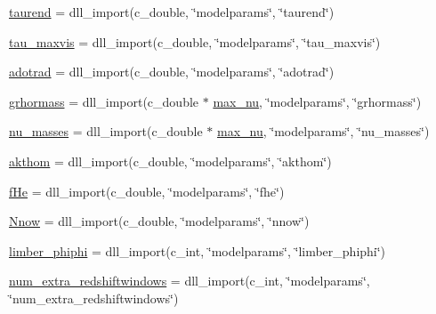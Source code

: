 \begin{DoxyCompactItemize}
\item 
\mbox{\hyperlink{namespacecamb_1_1model_ae2a4e5d8dff7debdb22015f3e0fcf129}{taurend}} = dll\+\_\+import(c\+\_\+double, \char`\"{}modelparams\char`\"{}, \char`\"{}taurend\char`\"{})
\item 
\mbox{\hyperlink{namespacecamb_1_1model_a3a9ced4c13d89e5355fd09949da4f1b7}{tau\+\_\+maxvis}} = dll\+\_\+import(c\+\_\+double, \char`\"{}modelparams\char`\"{}, \char`\"{}tau\+\_\+maxvis\char`\"{})
\item 
\mbox{\hyperlink{namespacecamb_1_1model_afd2b37e87bc43463aa6c8642feff62ae}{adotrad}} = dll\+\_\+import(c\+\_\+double, \char`\"{}modelparams\char`\"{}, \char`\"{}adotrad\char`\"{})
\item 
\mbox{\hyperlink{namespacecamb_1_1model_a0d98f795e1db0281c930cd8101f83b24}{grhormass}} = dll\+\_\+import(c\+\_\+double $\ast$ \mbox{\hyperlink{namespacecamb_1_1model_aa5aed77e19cbb25b308fbdd5e9cea419}{max\+\_\+nu}}, \char`\"{}modelparams\char`\"{}, \char`\"{}grhormass\char`\"{})
\item 
\mbox{\hyperlink{namespacecamb_1_1model_a3db563d6ded710e213d78130108bba29}{nu\+\_\+masses}} = dll\+\_\+import(c\+\_\+double $\ast$ \mbox{\hyperlink{namespacecamb_1_1model_aa5aed77e19cbb25b308fbdd5e9cea419}{max\+\_\+nu}}, \char`\"{}modelparams\char`\"{}, \char`\"{}nu\+\_\+masses\char`\"{})
\item 
\mbox{\hyperlink{namespacecamb_1_1model_aad1be5746ddc2de7cd9f498f39644dc6}{akthom}} = dll\+\_\+import(c\+\_\+double, \char`\"{}modelparams\char`\"{}, \char`\"{}akthom\char`\"{})
\item 
\mbox{\hyperlink{namespacecamb_1_1model_abe1c873e40ed51d45dc658926faeaf17}{f\+He}} = dll\+\_\+import(c\+\_\+double, \char`\"{}modelparams\char`\"{}, \char`\"{}fhe\char`\"{})
\item 
\mbox{\hyperlink{namespacecamb_1_1model_a62473452e3842b5d846062ac2140c5fc}{Nnow}} = dll\+\_\+import(c\+\_\+double, \char`\"{}modelparams\char`\"{}, \char`\"{}nnow\char`\"{})
\item 
\mbox{\hyperlink{namespacecamb_1_1model_aaff94e9b95fd6be5946fdfc0740db9d4}{limber\+\_\+phiphi}} = dll\+\_\+import(c\+\_\+int, \char`\"{}modelparams\char`\"{}, \char`\"{}limber\+\_\+phiphi\char`\"{})
\item 
\mbox{\hyperlink{namespacecamb_1_1model_ab77a78e6a26359172cfb4562fc2ab13d}{num\+\_\+extra\+\_\+redshiftwindows}} = dll\+\_\+import(c\+\_\+int, \char`\"{}modelparams\char`\"{}, \char`\"{}num\+\_\+extra\+\_\+redshiftwindows\char`\"{})
\item 

\end{DoxyCompactItemize}
